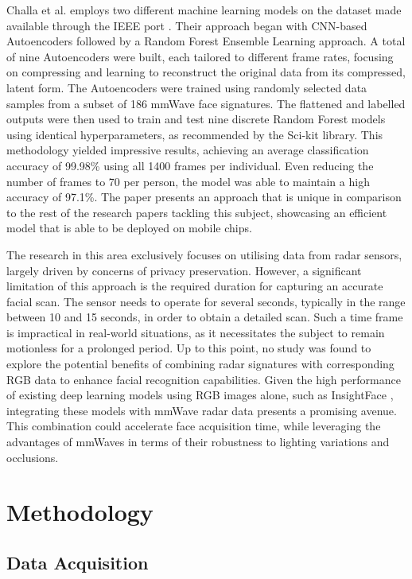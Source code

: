 \documentclass{mpaper}
\begin{document}
Challa et al. \cite{challa2021face} employs two different machine learning models on the dataset made available through the IEEE port \cite{mmwavefacedata}. Their approach began with CNN-based Autoencoders followed by a Random Forest Ensemble Learning approach. A total of nine Autoencoders were built, each tailored to different frame rates, focusing on compressing and learning to reconstruct the original data from its compressed, latent form. The Autoencoders were trained using randomly selected data samples from a subset of 186 mmWave face signatures. The flattened and labelled outputs were then used to train and test nine discrete Random Forest models using identical hyperparameters, as recommended by the Sci-kit library. This methodology yielded impressive results, achieving an average classification accuracy of 99.98\% using all 1400 frames per individual. Even reducing the number of frames to 70 per person, the model was able to maintain a high accuracy of 97.1\%. The paper presents an approach that is unique in comparison to the rest of the research papers tackling this subject, showcasing an efficient model that is able to be deployed on mobile chips.

The research in this area exclusively focuses on utilising data from radar sensors, largely driven by concerns of privacy preservation. However, a significant limitation of this approach is the required duration for capturing an accurate facial scan. The sensor needs to operate for several seconds, typically in the range between 10 and 15 seconds, in order to obtain a detailed scan. Such a time frame is impractical in real-world situations, as it necessitates the subject to remain motionless for a prolonged period. Up to this point, no study was found to explore the potential benefits of combining radar signatures with corresponding RGB data to enhance facial recognition capabilities. Given the high performance of existing deep learning models using RGB images alone, such as InsightFace \cite{deng2018arcface}, integrating these models with mmWave radar data presents a promising avenue. This combination could accelerate face acquisition time, while leveraging the advantages of mmWaves in terms of their robustness to lighting variations and occlusions.



\section{Methodology}

\subsection{Data Acquisition}
\end{document}
